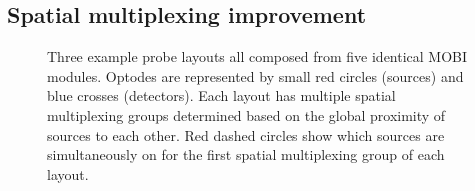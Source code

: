 \subsection{Spatial multiplexing improvement}
    \begin{figure}%
    	\begin{center}
     
    	\end{center}
    	\caption{Three example probe layouts all composed from five identical MOBI modules. Optodes are represented by small red circles (sources) and blue crosses (detectors). Each layout has multiple spatial multiplexing groups determined based on the global proximity of sources to each other. Red dashed circles show which sources are simultaneously on for the first spatial multiplexing group of each layout.} 
    	\label{fig:layouts}
    \end{figure} 
    

